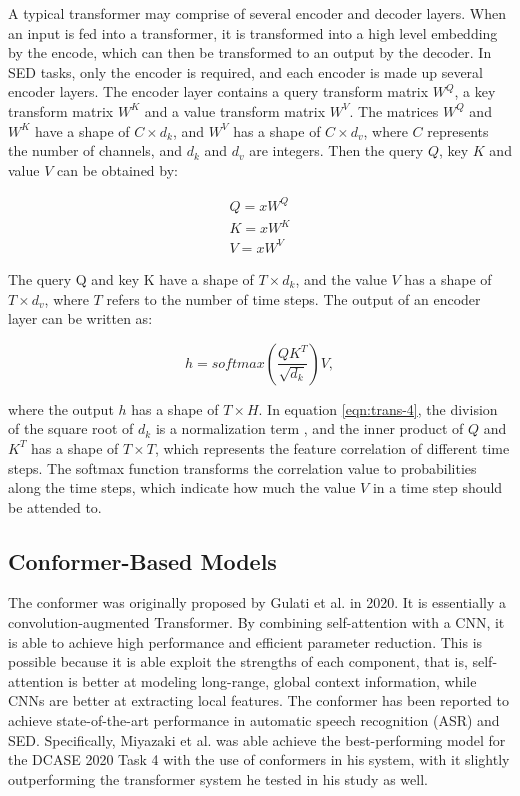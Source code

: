 A typical transformer may comprise of several encoder and decoder layers. When an input is fed into a transformer, it is transformed into a high level embedding by the encode, which can then be transformed to an output by the decoder. In SED tasks, only the encoder is required, and each encoder is made up several encoder layers. The encoder layer contains a query transform matrix \(W^Q\), a key transform matrix \(W^K\) and a value transform matrix \(W^V\). The matrices \(W^Q\) and \(W^K\) have a shape of \(C × d_k\), and \(W^V\) has a shape of \(C \times d_v\), where \(C\) represents the number of channels, and \(d_k\) and \(d_v\) are integers. Then the query \(Q\),  key \(K\) and value \(V\) can be obtained by:

\begin{align}
Q = xW^Q\\
K = xW^K\\
V = xW^V 
\end{align}

The query Q and key K have a shape of \(T \times d_k\), and the value \(V\) has a shape of \(T \times d_v\), where \(T\) refers to the number of time steps. The output of an encoder layer can be written as: 

\begin{equation}
\label{eqn:trans-4}
h = softmax(\frac{QK^T}{\sqrt{d_k}})V ,
\end{equation}

where the output \(h\) has a shape of \(T \times H\). In equation \ref{eqn:trans-4}, the division of the square root of \(d_k\) is a normalization term \cite{vaswani2017attention}, and the inner product of \(Q\) and \(K^T\) has a shape of \(T \times T\), which represents the feature correlation of different time steps. The softmax function transforms the correlation value to probabilities along the time steps, which indicate how much the value \(V\) in a time step should be attended to.

\subsection{Conformer-Based Models}
The conformer was originally proposed by Gulati et al. \cite{gulati2020conformer} in 2020. It is essentially a convolution-augmented Transformer. By combining self-attention with a CNN, it is able to achieve high performance and efficient parameter reduction. This is possible because it is able exploit the strengths of each component, that is, self-attention is better at modeling long-range, global context information, while CNNs are better at extracting local features. The conformer has been reported to achieve state-of-the-art performance in automatic speech recognition (ASR) and SED. Specifically, Miyazaki et al. \cite{Miyazaki2020CONFORMERBASEDSE} was able achieve the best-performing model for the DCASE 2020 Task 4 with the use of conformers in his system, with it slightly outperforming the transformer system he tested in his study as well.\\

